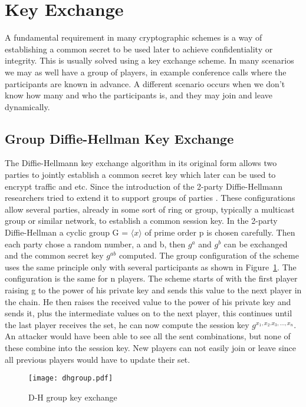 \section{Key Exchange}\label{sec:key_exchange}
A fundamental requirement in many cryptographic schemes is a way of establishing a common secret to be used later to achieve confidentiality or integrity. This is usually solved using a key exchange scheme. In many scenarios we may as well have a group of players, in example conference calls where the participants are known in advance. A different scenario occurs when we don't know how many and who the participants is, and they may join and leave dynamically. 

\subsection{Group Diffie-Hellman Key Exchange}
The Diffie-Hellmann key exchange algorithm in its original form allows two parties to jointly establish a common secret key which later can be used to encrypt traffic and etc. Since the introduction of the 2-party Diffie-Hellmann researchers tried to extend it to support groups of parties \cite{steiner1996diffie, groupDH}. These configurations allow several parties, already in some sort of ring or group, typically a multicast group or similar network, to establish a common session key. In the 2-party Diffie-Hellman a cyclic group G =  $\langle x \rangle$ of prime order p is chosen carefully. Then each party chose a random number, a and b, then $g^a$ and $g^b$ can be exchanged and the common secret key $g^{ab}$ computed. The group configuration of the scheme uses the same principle only with several participants as shown in Figure~\ref{fig:dhgroup}. The configuration is the same for n players. The scheme starts of with the first player raising g to the power of his private key and sends this value to the next player in the chain. He then raises the received value to the power of his private key and sends it, plus the intermediate values on to the next player, this continues until the last player receives the set, he can now compute the session key $g^{x_1,x_2.x_3,...,x_n}$. An attacker would have been able to see all the sent combinations, but none of these combine into the session key. New players can not easily join or leave since all previous players would have to update their set. 
\begin{figure}
\centering
\texttt{[image: dhgroup.pdf]}
\caption{D-H group key exchange}
\label{fig:dhgroup}
\end{figure}

